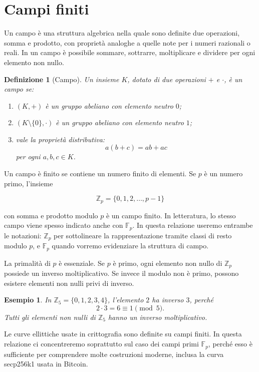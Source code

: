 \documentclass[12pt,a4paper,oneside]{report}
\newtheorem{definition}{Definizione}[chapter]
\newtheorem{example}{Esempio}[chapter]
\begin{document}
\section{Campi finiti}

Un campo è una struttura algebrica nella quale sono definite due operazioni, somma e prodotto, con proprietà analoghe a quelle note per i numeri razionali o reali. In un campo è possibile sommare, sottrarre, moltiplicare e dividere per ogni elemento non nullo.

\begin{definition}[Campo]
Un insieme \(K\), dotato di due operazioni \(+\) e \(\cdot\), è un campo se:
\begin{enumerate}
    \item \((K,+)\) è un gruppo abeliano con elemento neutro \(0\);
    \item \((K \setminus \{0\},\cdot)\) è un gruppo abeliano con elemento neutro \(1\);
    \item vale la proprietà distributiva:
    \[
    a(b+c)=ab+ac
    \]
    per ogni \(a,b,c \in K\).
\end{enumerate}
\end{definition}

Un campo è finito se contiene un numero finito di elementi. Se \(p\) è un numero primo, l'insieme

\begin{equation}
    \mathbb{Z}_p = \{0,1,2,\ldots,p-1\}
\end{equation}

con somma e prodotto modulo \(p\) è un campo finito. In letteratura, lo stesso campo viene spesso indicato anche con \(\mathbb{F}_p\). In questa relazione useremo entrambe le notazioni: \(\mathbb{Z}_p\) per sottolineare la rappresentazione tramite classi di resto modulo \(p\), e \(\mathbb{F}_p\) quando vorremo evidenziare la struttura di campo.

La primalità di \(p\) è essenziale. Se \(p\) è primo, ogni elemento non nullo di \(\mathbb{Z}_p\) possiede un inverso moltiplicativo. Se invece il modulo non è primo, possono esistere elementi non nulli privi di inverso.

\begin{example}
In \(\mathbb{Z}_5 = \{0,1,2,3,4\}\), l'elemento \(2\) ha inverso \(3\), perché
\[
2 \cdot 3 = 6 \equiv 1 \pmod 5.
\]
Tutti gli elementi non nulli di \(\mathbb{Z}_5\) hanno un inverso moltiplicativo.
\end{example}

Le curve ellittiche usate in crittografia sono definite su campi finiti. In questa relazione ci concentreremo soprattutto sul caso dei campi primi \(\mathbb{F}_p\), perché esso è sufficiente per comprendere molte costruzioni moderne, inclusa la curva secp256k1 usata in Bitcoin.
\end{document}
